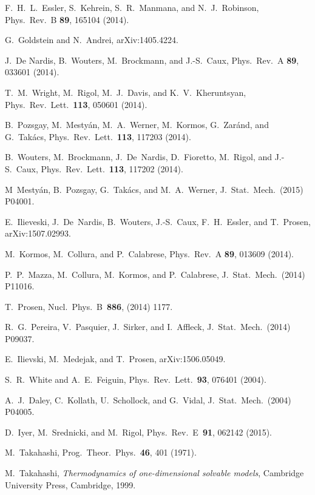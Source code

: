 \documentclass[twocolumn,superscriptaddress,prb,10pt]{revtex4-1}
\begin{document}
\begin{thebibliography}{99}
F.~H.~L.~Essler, S.~Kehrein, S.~R.~Manmana, and N.~J.~Robinson, Phys.\ Rev.\ B {\bf 89}, 
165104 (2014).

G.~Goldstein and N.~Andrei, arXiv:1405.4224. 


J.~De Nardis, B.~Wouters, M.~Brockmann, and J.-S.~Caux, Phys.\ Rev.\ A {\bf 89}, 
033601 (2014). 

T.~M.~Wright, M.~Rigol, M.~J.~Davis, and K.~V.~Kheruntsyan, Phys.\ Rev.\ Lett.\ {\bf 113}, 
050601 (2014).

B.~Pozsgay, M.~Mesty\'an, M.~A.~Werner, M.~Kormos, G.~Zar\'and, and G.~Tak\'acs,
Phys.\ Rev.\ Lett.\ {\bf 113}, 117203 (2014). 

B.~Wouters, M.~Brockmann, J.~De~Nardis, D.~Fioretto, M.~Rigol, and J.-S.~Caux, 
Phys.\ Rev.\ Lett.\ {\bf 113}, 117202 (2014). 

M~Mesty\'an, B.~Pozsgay, G.~Tak\'acs, and M.~A.~Werner, J.\ Stat.\ Mech.\ (2015) 
P04001.


E.~Ilieveski, J.~De~Nardis, B.~Wouters, J.-S.~Caux, F.~H.~Essler, and T.~Prosen, 
arXiv:1507.02993. 

M.~Kormos, M.~Collura, and P.~Calabrese, Phys.\ Rev.\ A {\bf 89}, 013609 
(2014).


P.~P.~Mazza, M.\ Collura, M.\ Kormos, and P.\ Calabrese, J.\ Stat.\ Mech.\  
(2014) P11016.

T.~Prosen, Nucl.\ Phys.\ B\ {\bf 886}, (2014) 1177.

R.~G.~Pereira, V.~Pasquier, J.~Sirker, and I.~Affleck, J.\ Stat.\ Mech.\ 
(2014) P09037. 

E.~Ilievski, M.~Medejak, and T.~Prosen, arXiv:1506.05049.

S.~R.~White and A.~E.~Feiguin, Phys.\ Rev.\ Lett.\ {\bf 93}, 076401 (2004).

\bibitem{daley-2004}
A.~J.~Daley, C.~Kollath, U.~Schollock, and G.~Vidal, J.\ Stat.\ Mech.\ (2004) P04005.

\bibitem{iyer-2015}
D.~Iyer, M.~Srednicki, and M.~Rigol, Phys.\ Rev.\ E\ {\bf 91}, 062142 (2015).

\bibitem{takahashi-1971} 
M.~Takahashi, Prog.\ Theor.\ Phys.\ {\bf 46}, 401 (1971). 

M.~Takahashi, {\it Thermodynamics of one-dimensional solvable models}, 
Cambridge University Press, Cambridge, 1999. 


\end{thebibliography}
\end{document}
